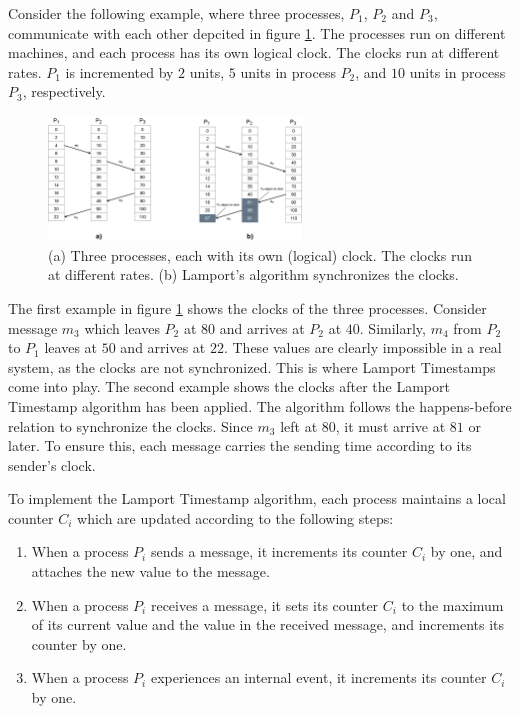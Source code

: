 \documentclass{article}
\begin{document}
    Consider the following example, where three processes, $P_1$, $P_2$ and $P_3$, communicate with each other depcited in figure \ref{fig:lamport_timestamp}. The processes run on different machines, and each process has its own logical clock. The clocks run at different rates. $P_1$ is incremented by $2$ units, $5$ units in process $P_2$, and $10$ units in process $P_3$, respectively.
    \begin{figure}[h!]
      \centering
      \includegraphics[width=0.6\textwidth]{img/lamport_timestamp.png}
      \caption{(a) Three processes, each with its own (logical) clock. The clocks run at different rates. (b) Lamport's algorithm synchronizes the clocks.}
      \label{fig:lamport_timestamp}
    \end{figure}

    The first example in figure \ref{fig:lamport_timestamp} shows the clocks of the three processes. Consider message $m_3$ which leaves $P_2$ at $80$ and arrives at $P_2$ at $40$. Similarly, $m_4$ from $P_2$ to $P_1$ leaves at $50$ and arrives at $22$. These values are clearly impossible in a real system, as the clocks are not synchronized. This is where Lamport Timestamps come into play.
    The second example shows the clocks after the Lamport Timestamp algorithm has been applied. The algorithm follows the happens-before relation to synchronize the clocks. Since $m_3$ left at $80$, it must arrive at $81$ or later. To ensure this, each message carries the sending time according to its sender's clock.

    To implement the Lamport Timestamp algorithm, each process maintains a local counter $C_i$ which are updated according to the following steps\cite{Raynal-Singhal:1996}:
    \begin{enumerate}
      \item When a process $P_i$ sends a message, it increments its counter $C_i$ by one, and attaches the new value to the message.
      \item When a process $P_i$ receives a message, it sets its counter $C_i$ to the maximum of its current value and the value in the received message, and increments its counter by one.
      \item When a process $P_i$ experiences an internal event, it increments its counter $C_i$ by one.
    \end{enumerate}
\end{document}

